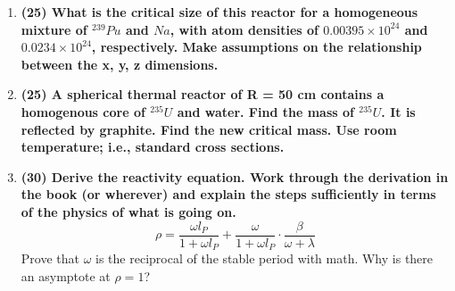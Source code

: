 \documentclass[11pt,a4paper]{article}
\begin{document}
\begin{enumerate}[leftmargin=*,topsep=0pt,font=\bfseries]
        \newpage 
    \item\textbf{(25) What is the critical size of this reactor for a homogeneous mixture of $^{239}Pu$ and $Na$, with atom densities of $0.00395 \times 10^{24}$ and $0.0234 \times 10^{24}$, respectively. Make assumptions on the relationship between the x, y, z dimensions.}
        \vspace{0.25in}\\
















        \newpage 
    \item\textbf{(25) A spherical thermal reactor of R = 50 cm contains a homogenous core of $^{235}U$ and water. Find the mass of $^{235}U$. It is reflected by graphite. Find the new critical mass. Use room temperature; i.e., standard cross sections.}
        \vspace{0.25in}\\























        \newpage 
    \item\textbf{(30) Derive the reactivity equation. Work through the derivation in the book (or wherever) and explain the steps sufficiently in terms of the physics of what is going on.}\\
        \begin{equation} \label{eq-reactivity}
            \rho=\frac{\omega l_P}{1+\omega l_P}+\frac{\omega}{1+\omega l_P}\cdot\frac{\beta}{\omega+\lambda}
        \end{equation}
        Prove that $\omega$ is the reciprocal of the stable period with math. Why is there an asymptote at $\rho = 1$?
        \vspace{0.25in}\\



















\end{enumerate}
\end{document}
